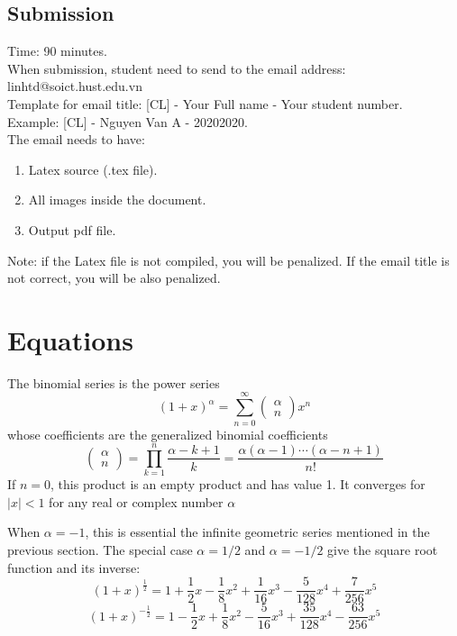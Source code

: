 \documentclass{article}
\begin{document}
		\subsection{Submission}
			Time: 90 minutes.\\
			When submission, student need to send to the email address: linhtd@soict.hust.edu.vn\\
			Template for email title: [CL] - Your Full name - Your student number.\\
			Example: [CL] - Nguyen Van A - 20202020.\\
			The email needs to have:
			\begin{enumerate}
				\item Latex source (.tex file).
				\item All images inside the document.
				\item Output pdf file.
			\end{enumerate}
			Note: if the Latex file is not compiled, you will be penalized. If the email title is not correct, you will be also penalized.
	
	\section{Equations}
	\label{sec:eq}
		The binomial series is the power series
		\begin{equation}
			(1+x)^{\alpha} = \sum_{n=0}^{\infty} \left( \begin{array}{c} \alpha \\ n \end{array} \right) x^{n} 
		\label{eq:1}
		\end{equation}
		whose coefficients are the generalized binomial coefficients
		\begin{equation}
			\left( \begin{array}{c} \alpha \\ n \end{array} \right) = \prod_{k=1}^{n} \frac{\alpha - k + 1}{k} = \frac{\alpha(\alpha - 1)\cdots(\alpha - n +1)}{n!}
		\label{eq:2}
		\end{equation}
		If $n = 0$, this product is an empty product and has value 1. It converges for $|x| < 1$ for any real or complex number $\alpha$
		
		When $\alpha = -1$, this is essential the infinite geometric series mentioned in the previous section. The special case $\alpha = 1/2$ and $\alpha = -1/2$ give the square root function and its inverse:
		\begin{equation}
			(1+x)^{\frac{1}{2}} = 1 + \frac{1}{2} x - \frac{1}{8} x^{2} + \frac{1}{16} x^{3} - \frac{5}{128} x^{4} + \frac{7}{256} x^{5}
		\label{eq:3}
		\end{equation}
		\begin{equation}
			(1+x)^{-\frac{1}{2}} = 1 - \frac{1}{2} x + \frac{1}{8} x^{2} - \frac{5}{16} x^{3} + \frac{35}{128} x^{4} - \frac{63}{256} x^{5}
		\label{eq:4}
		\end{equation}
		
\end{document}
